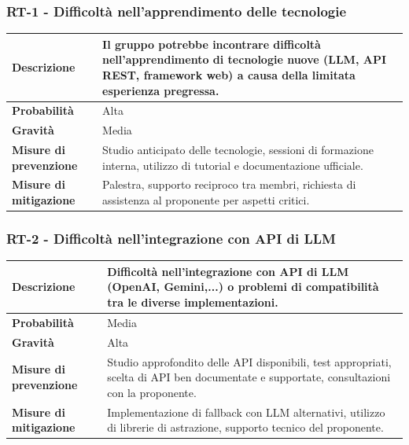 \documentclass[11pt,a4paper]{article}
\begin{document}
\subsubsection{RT-1 - Difficoltà nell'apprendimento delle tecnologie}
\begin{center}
\begin{tabular}{|p{3cm}|p{12cm}|}
    \hline
    \textbf{Descrizione} & Il gruppo potrebbe incontrare difficoltà nell'apprendimento di tecnologie nuove (LLM, API REST, framework web) a causa della limitata esperienza pregressa. \\
    \hline
    \textbf{Probabilità} & Alta \\
    \hline
    \textbf{Gravità} & Media \\
    \hline
    \textbf{Misure di prevenzione} & Studio anticipato delle tecnologie, sessioni di formazione interna, utilizzo di tutorial e documentazione ufficiale. \\
    \hline
    \textbf{Misure di mitigazione} & Palestra, supporto reciproco tra membri, richiesta di assistenza al proponente per aspetti critici. \\
    \hline
\end{tabular}
\end{center}

\subsubsection{RT-2 - Difficoltà nell'integrazione con API di LLM}
\begin{center}
\begin{tabular}{|p{3cm}|p{12cm}|}
    \hline
    \textbf{Descrizione} & Difficoltà nell'integrazione con API di LLM (OpenAI, Gemini,...) o problemi di compatibilità tra le diverse implementazioni. \\
    \hline
    \textbf{Probabilità} & Media \\
    \hline
    \textbf{Gravità} & Alta \\
    \hline
    \textbf{Misure di prevenzione} & Studio approfondito delle API disponibili, test appropriati, scelta di API ben documentate e supportate, consultazioni con la proponente. \\
    \hline
    \textbf{Misure di mitigazione} & Implementazione di fallback con LLM alternativi, utilizzo di librerie di astrazione, supporto tecnico del proponente. \\
    \hline
\end{tabular}
\end{center}
\end{document}
